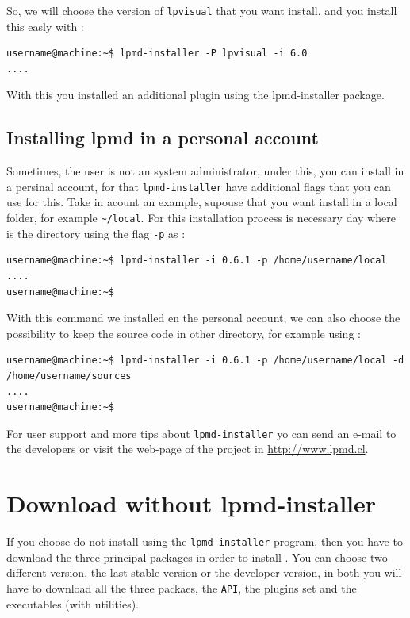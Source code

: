 So, we will choose the version of \verb|lpvisual| that you want install, and
you install this easly with :

\begin{verbatim}
username@machine:~$ lpmd-installer -P lpvisual -i 6.0
....
\end{verbatim}

With this you installed an additional plugin using the lpmd-installer package.

\subsection{Installing lpmd in a personal account}

Sometimes, the user is not an system administrator, under this, you can install
{\lpmd} in a persinal account, for that \verb|lpmd-installer| have additional
flags that you can use for this. Take in acount an example, supouse that you
want install {\lpmd} in a local folder, for example \verb|~/local|. For this
installation process is necessary day where is the directory using the flag
\verb|-p| as :

\begin{verbatim}
username@machine:~$ lpmd-installer -i 0.6.1 -p /home/username/local
....
username@machine:~$
\end{verbatim}

With this command we installed {\lpmd} en the personal account, we can also
choose the possibility to keep the source code in other directory, for example
using :

\begin{verbatim}
username@machine:~$ lpmd-installer -i 0.6.1 -p /home/username/local -d /home/username/sources
....
username@machine:~$
\end{verbatim}

For user support and more tips about \verb|lpmd-installer| yo can send an
e-mail to the developers or visit the web-page of the project in
\url{http://www.lpmd.cl}.

\section{Download without lpmd-installer}
\label{sec:descarga}

If you choose do not install {\lpmd} using the \verb|lpmd-installer| program,
then you have to download the three principal packages in order to install
{\lpmd}. You can choose two different version, the last stable version or the
developer version, in both you will have to download all the three packaes, the
\verb|API|, the plugins set and the executables (with utilities).

